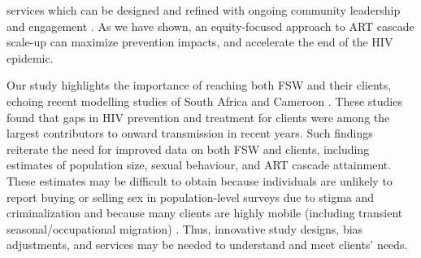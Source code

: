 services which can be designed and refined with ongoing community leadership and engagement
\cite{Chikwari2018,Mlambo2019,Comins2022}.
As we have shown, an equity-focused approach to ART cascade scale-up
can maximize prevention impacts, and accelerate the end of the HIV epidemic.
\par
Our study highlights the importance of reaching both FSW and their clients,
echoing recent modelling studies of South Africa and Cameroon \cite{Stone2021,Silhol2024}.
These studies found that gaps in HIV prevention and treatment for clients
were among the largest contributors to onward transmission in recent years.
Such findings reiterate the need for improved data on both FSW and clients,
including estimates of population size, sexual behaviour, and ART cascade attainment.
These estimates may be difficult to obtain
because individuals are unlikely to report buying or selling sex in population-level surveys
due to stigma and criminalization \cite{Behanzin2013} and
because many clients are highly mobile
(including transient seasonal/occupational migration) \cite{Akullian2017,Camlin2019}.
Thus, innovative study designs, bias adjustments, and services may be needed
to understand and meet clients' needs.
\par
